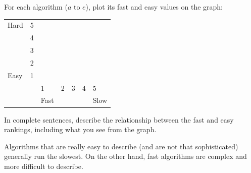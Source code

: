 \Q For each algorithm ($a$ to $e$), plot its fast and easy values on the graph:

\newcommand{\X}{\ans{X}}

\begin{table}[h]
\centering
\renewcommand{\arraystretch}{1.6}
\begin{tabularx}{275pt}{X C{28pt} | C{28pt} C{28pt} C{28pt} C{28pt} C{28pt}}
Hard & 5 & \X                    \\
     & 4 &    & \X               \\
     & 3 &    &   & \X           \\
     & 2 &    &   &   & \X       \\
Easy & 1 &    &   &   &   & \X   \\
\hline
     & & 1    & 2 & 3 & 4 & 5    \\
     & & Fast &   &   &   & Slow \\
\end{tabularx}
\end{table}


\Q In complete sentences, describe the relationship between the fast and easy rankings, including what you see from the graph.

\begin{answer}
Algorithms that are really easy to describe (and are not that sophisticated) generally run the slowest.
On the other hand, fast algorithms are complex and more difficult to describe.
\end{answer}


\vfill
{}
